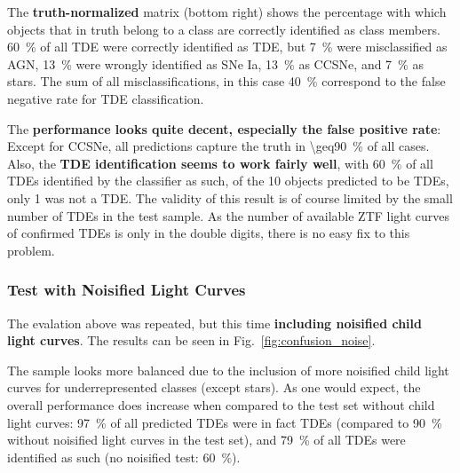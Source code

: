 The \textbf{truth-normalized} matrix (bottom right) shows the percentage with which objects that in truth belong to a class are correctly identified as class members. \SI{60}{\percent} of all TDE were correctly identified as TDE, but \SI{7}{\percent} were misclassified as AGN, \SI{13}{\percent} were wrongly identified as SNe Ia, \SI{13}{\percent} as CCSNe, and \SI{7}{\percent} as stars. The sum of all misclassifications, in this case \SI{40}{\percent} correspond to the false negative rate for TDE classification.

The \textbf{performance looks quite decent, especially the false positive rate}: Except for CCSNe, all predictions capture the truth in \SI{\geq90}{\percent} of all cases. Also, the \textbf{TDE identification seems to work fairly well}, with \SI{60}{\percent} of all TDEs identified by the classifier as such, of the 10 objects predicted to be TDEs, only 1 was not a TDE. The validity of this result is of course limited by the small number of TDEs in the test sample. As the number of available ZTF light curves of confirmed TDEs is only in the double digits, there is no easy fix to this problem.

\subsubsection{Test with Noisified Light Curves}
The evalation above was repeated, but this time \textbf{including noisified child light curves}. The results can be seen in Fig.~\ref{fig:confusion_noise}.

The sample looks more balanced due to the inclusion of more noisified child light curves for underrepresented classes (except stars). As one would expect, the overall performance does increase when compared to the test set without child light curves: \SI{97}{\percent} of all predicted TDEs were in fact TDEs (compared to \SI{90}{\percent} without noisified light curves in the test set), and \SI{79}{\percent} of all TDEs were identified as such (no noisified test: \SI{60}{\percent}).

